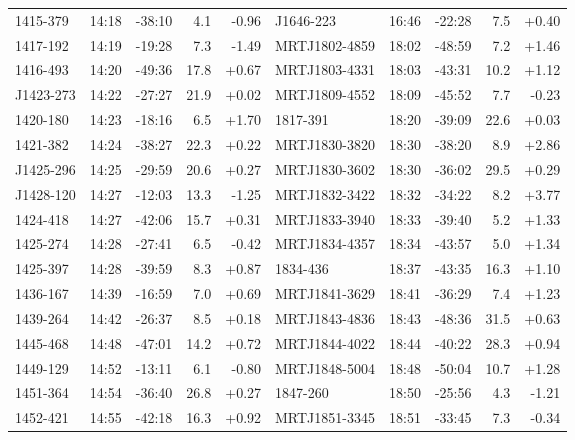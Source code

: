 \documentclass[preprint]{aastex}
\begin{document}
\begin{table}[ht]
\begin{tabular}{l|lrrr||l|lrrr}
  1415-379 & 14:18 & -38:10 &    4.1 & -0.96 &  J1646-223 & 16:46 & -22:28 &    7.5 & +0.40 \\
  1417-192 & 14:19 & -19:28 &    7.3 & -1.49 & MRTJ1802-4859 & 18:02 & -48:59 &    7.2 & +1.46 \\
  1416-493 & 14:20 & -49:36 &   17.8 & +0.67 & MRTJ1803-4331 & 18:03 & -43:31 &   10.2 & +1.12 \\
 J1423-273 & 14:22 & -27:27 &   21.9 & +0.02 & MRTJ1809-4552 & 18:09 & -45:52 &    7.7 & -0.23 \\
  1420-180 & 14:23 & -18:16 &    6.5 & +1.70 &   1817-391 & 18:20 & -39:09 &   22.6 & +0.03 \\
  1421-382 & 14:24 & -38:27 &   22.3 & +0.22 & MRTJ1830-3820 & 18:30 & -38:20 &    8.9 & +2.86 \\
 J1425-296 & 14:25 & -29:59 &   20.6 & +0.27 & MRTJ1830-3602 & 18:30 & -36:02 &   29.5 & +0.29 \\
 J1428-120 & 14:27 & -12:03 &   13.3 & -1.25 & MRTJ1832-3422 & 18:32 & -34:22 &    8.2 & +3.77 \\
  1424-418 & 14:27 & -42:06 &   15.7 & +0.31 & MRTJ1833-3940 & 18:33 & -39:40 &    5.2 & +1.33 \\
  1425-274 & 14:28 & -27:41 &    6.5 & -0.42 & MRTJ1834-4357 & 18:34 & -43:57 &    5.0 & +1.34 \\
  1425-397 & 14:28 & -39:59 &    8.3 & +0.87 &   1834-436 & 18:37 & -43:35 &   16.3 & +1.10 \\
  1436-167 & 14:39 & -16:59 &    7.0 & +0.69 & MRTJ1841-3629 & 18:41 & -36:29 &    7.4 & +1.23 \\
  1439-264 & 14:42 & -26:37 &    8.5 & +0.18 & MRTJ1843-4836 & 18:43 & -48:36 &   31.5 & +0.63 \\
  1445-468 & 14:48 & -47:01 &   14.2 & +0.72 & MRTJ1844-4022 & 18:44 & -40:22 &   28.3 & +0.94 \\
  1449-129 & 14:52 & -13:11 &    6.1 & -0.80 & MRTJ1848-5004 & 18:48 & -50:04 &   10.7 & +1.28 \\
  1451-364 & 14:54 & -36:40 &   26.8 & +0.27 &   1847-260 & 18:50 & -25:56 &    4.3 & -1.21 \\
  1452-421 & 14:55 & -42:18 &   16.3 & +0.92 & MRTJ1851-3345 & 18:51 & -33:45 &    7.3 & -0.34 \\
\hline
\end{tabular}
\end{table}
\end{document}
